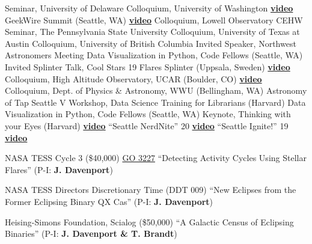 \documentclass{article}
\newcommand\blfootnote[1]{%
  \begingroup
  \renewcommand\thefootnote{}\footnote{#1}%
  \addtocounter{footnote}{-1}%
  \endgroup
}
\begin{document}
\begin{llist}
Seminar, University of Delaware 
Colloquium, University of Washington \href{https://www.youtube.com/watch?v=X6r9fvRcgo4}{\color{blue}\bf{video}} 
GeekWire Summit (Seattle, WA) \href{https://www.youtube.com/watch?v=mG9h1gHb4N4}{\color{blue}\bf{video}} 
Colloquium, Lowell Observatory 
CEHW Seminar, The Pennsylvania State University 
Colloquium, University of Texas at Austin 
Colloquium, University of British Columbia 
Invited Speaker, Northwest Astronomers Meeting 
Data Visualization in Python, Code Fellows (Seattle, WA) 
Invited Splinter Talk, Cool Stars 19 Flares Splinter (Uppsala, Sweden) \href{https://www.youtube.com/watch?v=3SDwC7tTCSQ}{\color{blue}\bf{video}} 
Colloquium, High Altitude Observatory, UCAR (Boulder, CO) \href{https://www.youtube.com/watch?v=Gf7jsYA6oJ8}{\color{blue}\bf{video}}
Colloquium, Dept. of Physics \& Astronomy, WWU (Bellingham, WA)
Astronomy of Tap Seattle V 
Workshop, Data Science Training for Librarians (Harvard) 
Data Visualization in Python, Code Fellows (Seattle, WA) 
Keynote, Thinking with your Eyes (Harvard) \href{https://www.youtube.com/watch?v=kmSr60TmNFg}{\color{blue}\bf{video}}  
``Seattle NerdNite'' 20 \href{https://vimeo.com/78773806}{\color{blue}\bf{video}}
``Seattle Ignite!'' 19 \href{http://www.youtube.com/watch?v=vINb5GCtDR8}{\color{blue} \bf{video}}






NASA TESS Cycle 3 (\$40,000) \href{https://heasarc.gsfc.nasa.gov/docs/tess/approved-programs.html#cycle-3}{\color{blue} GO 3227}
``Detecting Activity Cycles Using Stellar Flares'' (P-I: {\bf J. Davenport})

NASA TESS Directors Discretionary Time (DDT 009) 
``New Eclipses from the Former Eclipsing Binary QX Cas'' (P-I: {\bf J. Davenport})

Heising-Simons Foundation, Scialog (\$50,000) 
``A Galactic Census of Eclipsing Binaries'' (P-I: {\bf J. Davenport \& T. Brandt})


\end{llist}
\end{document}
